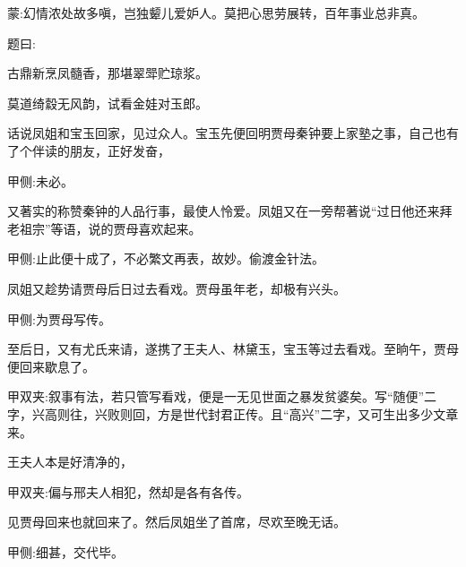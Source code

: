
\begin{parag}
    \begin{note}蒙:幻情浓处故多嗔，岂独颦儿爱妒人。莫把心思劳展转，百年事业总非真。\end{note}
\end{parag}


\begin{parag}
    题曰:
\end{parag}


\begin{poem}
    \begin{pl}古鼎新烹凤髓香，那堪翠斝贮琼浆。\end{pl}

    \begin{pl}莫道绮縠无风韵，试看金娃对玉郎。\end{pl}
\end{poem}


\begin{parag}
    话说凤姐和宝玉回家，见过众人。宝玉先便回明贾母秦钟要上家塾之事，自己也有了个伴读的朋友，正好发奋，\begin{note}甲侧:未必。\end{note}又著实的称赞秦钟的人品行事，最使人怜爱。凤姐又在一旁帮著说“过日他还来拜老祖宗”等语，说的贾母喜欢起来。\begin{note}甲侧:止此便十成了，不必繁文再表，故妙。偷渡金针法。\end{note}凤姐又趁势请贾母后日过去看戏。贾母虽年老，却极有兴头。\begin{note}甲侧:为贾母写传。\end{note}至后日，又有尤氏来请，遂携了王夫人、林黛玉，宝玉等过去看戏。至晌午，贾母便回来歇息了。\begin{note}甲双夹:叙事有法，若只管写看戏，便是一无见世面之暴发贫婆矣。写“随便”二字，兴高则往，兴败则回，方是世代封君正传。且“高兴”二字，又可生出多少文章来。\end{note}王夫人本是好清净的，\begin{note}甲双夹:偏与邢夫人相犯，然却是各有各传。\end{note}见贾母回来也就回来了。然后凤姐坐了首席，尽欢至晚无话。\begin{note}甲侧:细甚，交代毕。\end{note}
\end{parag}


